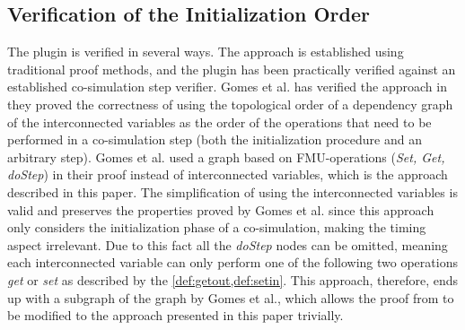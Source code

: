 \subsection{Verification of the Initialization Order}
The plugin is verified in several ways. The approach is established using traditional proof methods, and the plugin has been practically verified against an established co-simulation step verifier. Gomes et al. has verified the approach in \cite{gomes_lucio_vangheluwe_2019} they proved the correctness of using the topological order of a dependency graph of the interconnected variables as the order of the operations that need to be performed in a co-simulation step (both the initialization procedure and an arbitrary step). Gomes et al. \cite{gomes_lucio_vangheluwe_2019} used a graph based on FMU-operations (\textit{Set, Get, doStep}) in their proof instead of interconnected variables, which is the approach described in this paper. The simplification of using the interconnected variables is valid and preserves the properties proved by Gomes et al. since this approach only considers the initialization phase of a co-simulation, making the timing aspect irrelevant. Due to this fact all the \textit{doStep} nodes can be omitted, meaning each interconnected variable can only perform one of the following two operations \textit{get} or \textit{set} as described by the \cref{def:getout,def:setin}.
This approach, therefore, ends up with a subgraph of the graph by Gomes et al.\cite{gomes_lucio_vangheluwe_2019}, which allows the proof from \cite{gomes_lucio_vangheluwe_2019} to be modified to the approach presented in this paper trivially.

